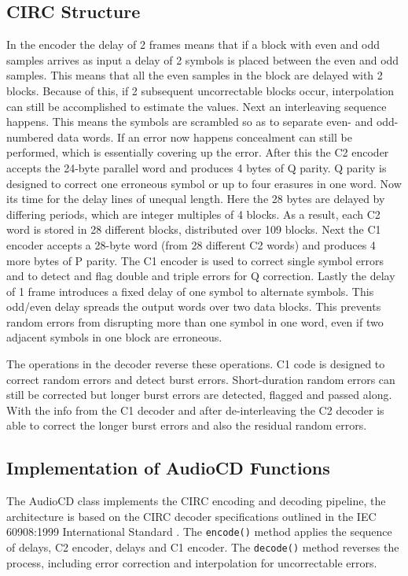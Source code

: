 \documentclass[11pt,a4paper]{article}
\begin{document}
\subsection{CIRC Structure}
In the encoder the delay of 2 frames means that if a block with even and odd samples arrives as input a delay of 2 symbols is placed between the even and odd samples. This means that all the even samples in the block are delayed with 2 blocks. Because of this, if 2 subsequent uncorrectable blocks occur, interpolation can still be accomplished to estimate the values. Next an interleaving sequence happens. This means the symbols are scrambled so as to separate even- and odd-numbered data words. If an error now happens concealment can still be performed, which is essentially covering up the error. After this the C2 encoder accepts the 24-byte parallel word and produces 4 bytes of Q parity. Q parity is designed to correct one erroneous symbol or up to four erasures in one word. Now its time for the delay lines of unequal length. Here the 28 bytes are delayed by differing periods, which are integer multiples of 4 blocks. As a result, each C2 word is stored in 28 different blocks, distributed over 109 blocks. Next the C1 encoder accepts a 28-byte word (from 28 different C2 words) and produces 4 more bytes of P parity. The C1 encoder is used to correct single symbol errors and to detect and flag double and triple errors for Q correction. Lastly the delay of 1 frame introduces a fixed delay of one symbol to alternate symbols. This odd/even delay spreads the output words over two data blocks. This prevents random errors from disrupting more than one symbol in one word, even if two adjacent symbols in one block are erroneous.

The operations in the decoder reverse these operations. C1 code is designed to correct random errors and detect burst errors. Short-duration random errors can still be corrected but longer burst errors are detected, flagged and passed along. With the info from the C1 decoder and after de-interleaving the C2 decoder is able to correct the longer burst errors and also the residual random errors.

\subsection{Implementation of AudioCD Functions}
The AudioCD class implements the CIRC encoding and decoding pipeline, the architecture is based on the CIRC decoder specifications outlined in the IEC 60908:1999 International Standard \cite[pp.~155, 157]{iec60908_1999}. The \texttt{encode()} method applies the sequence of delays, C2 encoder, delays and C1 encoder. The \texttt{decode()} method reverses the process, including error correction and interpolation for uncorrectable errors.
\end{document}
